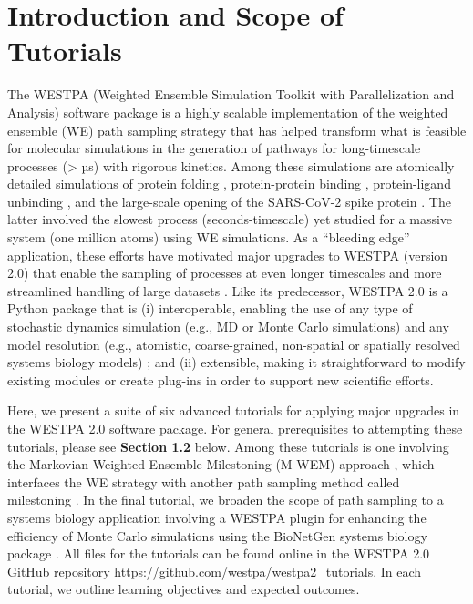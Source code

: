 \section{Introduction and Scope of Tutorials}

The WESTPA (Weighted Ensemble Simulation Toolkit with Parallelization and Analysis) software package is a highly scalable implementation of the weighted ensemble (WE) path sampling strategy \citep{huber_weighted-ensemble_1996,zuckerman_weighted_2017} that has helped transform what is feasible for molecular simulations in the generation of pathways for long-timescale processes (> µs) with rigorous kinetics.
Among these simulations are atomically detailed simulations of protein folding \citep{adhikari_computational_2019}, protein-protein binding \citep{saglam_proteinprotein_2019}, protein-ligand unbinding \citep{lotz_unbiased_2018}, and the large-scale opening of the SARS-CoV-2 spike protein \citep{sztain_glycan_2021}. 
The latter involved the slowest process (seconds-timescale) yet studied for a massive system (one million atoms) using WE simulations. 
As a “bleeding edge” application, these efforts have motivated major upgrades to WESTPA (version 2.0) that enable the sampling of processes at even longer timescales and more streamlined handling of large datasets \citep{russo_westpa_2022}. 
Like its predecessor, WESTPA 2.0 is a Python package that is (i) interoperable, enabling the use of any type of stochastic dynamics simulation (e.g., MD or Monte Carlo simulations) and any model resolution (e.g., atomistic, coarse-grained, non-spatial or spatially resolved systems biology models) \citep{donovan_efficient_2013,donovan_unbiased_2016}; and (ii) extensible, making it straightforward to modify existing modules or create plug-ins in order to support new scientific efforts. 

Here, we present a suite of six advanced tutorials for applying major upgrades in the WESTPA 2.0 software package. 
For general prerequisites to attempting these tutorials, please see \textbf{Section 1.2} below. 
Among these tutorials is one involving the Markovian Weighted Ensemble Milestoning (M-WEM) approach \citep{Ray2022Markovian}, which interfaces the WE strategy with another path sampling method called milestoning \citep{Faradjian2004Computing,West2007Extending}. 
In the final tutorial, we broaden the scope of path sampling to a systems biology application involving a WESTPA plugin for enhancing the efficiency of Monte Carlo simulations using the BioNetGen systems biology package \citep{harris_bionetgen_2016, tapia_mcell-r_2019}. 
All files for the tutorials can be found online in the WESTPA 2.0 GitHub repository {\url{https://github.com/westpa/westpa2_tutorials}}. 
In each tutorial, we outline learning objectives and expected outcomes. 

